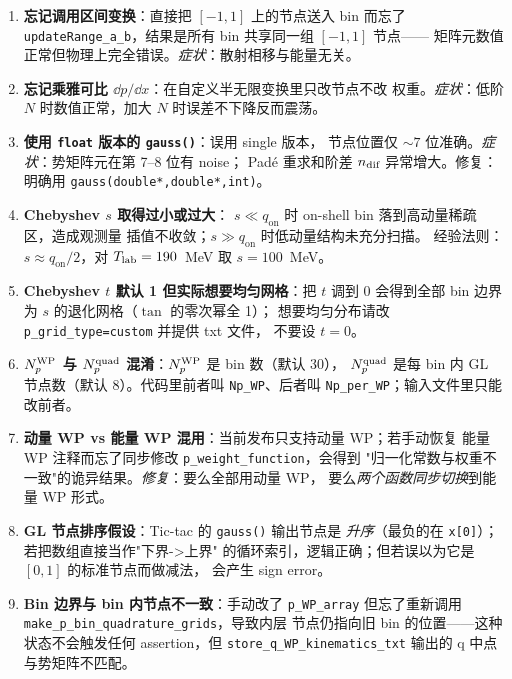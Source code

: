 \begin{pitfallbox}[title={Gauss--Legendre / Chebyshev 常见陷阱清单}]
\begin{enumerate}

\item \textbf{忘记调用区间变换}：直接把 $[-1,1]$ 上的节点送入 bin 而忘了
      \texttt{updateRange\_a\_b}，结果是所有 bin 共享同一组 $[-1,1]$ 节点——
      矩阵元数值正常但物理上完全错误。\emph{症状}：散射相移与能量无关。

\item \textbf{忘记乘雅可比 $\dd p/\dd x$}：在自定义半无限变换里只改节点不改
      权重。\emph{症状}：低阶 $N$ 时数值正常，加大 $N$ 时误差不下降反而震荡。

\item \textbf{使用 \texttt{float} 版本的 \texttt{gauss()}}：误用 single 版本，
      节点位置仅 $\sim 7$ 位准确。\emph{症状}：势矩阵元在第 7--8 位有 noise；
      Padé 重求和阶差 $n_{\text{dif}}$ 异常增大。修复：明确用
      \texttt{gauss(double*,double*,int)}。

\item \textbf{Chebyshev $s$ 取得过小或过大}：
      $s\ll q_{\text{on}}$ 时 on-shell bin 落到高动量稀疏区，造成观测量
      插值不收敛；$s\gg q_{\text{on}}$ 时低动量结构未充分扫描。
      经验法则：$s\approx q_{\text{on}}/2$，对 ${T_{\text{lab}}}=190$~MeV 取 $s=100$~MeV。

\item \textbf{Chebyshev $t$ 默认 1 但实际想要均匀网格}：把 $t$ 调到 0
      会得到全部 bin 边界为 $s$ 的退化网格（$\tan$ 的零次幂全 1）；
      想要均匀分布请改 \texttt{p\_grid\_type=custom} 并提供 txt 文件，
      不要设 $t=0$。

\item \textbf{${N_{p}^{\text{WP}}}$ 与 ${N_{p}^{\text{quad}}}$ 混淆}：${N_{p}^{\text{WP}}}$ 是 bin 数（默认 30），
      ${N_{p}^{\text{quad}}}$ 是每 bin 内 GL 节点数（默认 8）。代码里前者叫
      \texttt{Np\_WP}、后者叫 \texttt{Np\_per\_WP}；输入文件里只能改前者。

\item \textbf{动量 WP vs 能量 WP 混用}：当前发布只支持动量 WP；若手动恢复
      能量 WP 注释而忘了同步修改 \texttt{p\_weight\_function}，会得到
      "归一化常数与权重不一致"的诡异结果。\emph{修复}：要么全部用动量 WP，
      要么\emph{两个函数同步切换}到能量 WP 形式。

\item \textbf{GL 节点排序假设}：Tic-tac 的 \texttt{gauss()} 输出节点是
      \emph{升序}（最负的在 \texttt{x[0]}）；若把数组直接当作"下界->上界"
      的循环索引，逻辑正确；但若误以为它是 $[0,1]$ 的标准节点而做减法，
      会产生 sign error。

\item \textbf{Bin 边界与 bin 内节点不一致}：手动改了 \texttt{p\_WP\_array}
      但忘了重新调用 \texttt{make\_p\_bin\_quadrature\_grids}，导致内层
      节点仍指向旧 bin 的位置——这种状态不会触发任何 assertion，但
      \texttt{store\_q\_WP\_kinematics\_txt} 输出的 q 中点与势矩阵不匹配。

\end{enumerate}
\end{pitfallbox}

